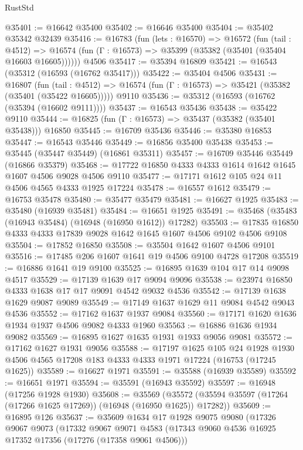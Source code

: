 \begin{lexlean}{RustStd}
\begin{coremodule}
@35401 := @16642 @35400
@35402 := @16646 @35400
@35404 := @35402 @35342 @32439
@35416 := @16783
    (fun (lets : @16570) =>
    @16572
      (fun (tail : @4512) =>
      @16574 (fun (Γ : @16573) => @35399 (@35382 (@35401 (@35404 @16603 @16605))))))
    @4506
@35417 := @35394 @16809
@35421 := @16543 (@35312 (@16593 (@16762 @35417)))
@35422 := @35404 @4506
@35431 := @16807
    (fun (tail : @4512) => @16574 (fun (Γ : @16573) => @35421 (@35382 (@35401 (@35422 @16605)))))
    @9110
@35436 := @35312 (@16593 (@16762 (@35394 (@16602 @9111))))
@35437 := @16543 @35436
@35438 := @35422 @9110
@35444 := @16825 (fun (Γ : @16573) => @35437 (@35382 (@35401 @35438))) @16850
@35445 := @16709 @35436
@35446 := @35380 @16853
@35447 := @16543 @35446
@35449 := @16856 @35400 @35438
@35453 := @35445 (@35447 @35449) (@16861 @35311)
@35457 := @16709 @35446 @35449 (@16866 @35379)
@35468 := @17722 @16850 @4333 @4333 @1614 @1642 @1645 @1607 @4506 @9028 @4506 @9110
@35477 := @17171 @1612 @105 @24 @11 @4506 @4565 @4333 @1925 @17224
@35478 := @16557 @1612
@35479 := @16753 @35478
@35480 := @35477 @35479
@35481 := @16627 @1925
@35483 := @35480 (@16939 @35481)
@35484 := @16651 @1925
@35491 := @35468 (@35483 (@16943 @35484) (@16948 (@16950 @1612)) @17282)
@35503 := @17835 @16850 @4333 @4333 @17839 @9028 @1642 @1645 @1607 @4506 @9102 @4506 @9108
@35504 := @17852 @16850
@35508 := @35504 @1642 @1607 @4506 @9101
@35516 := @17485 @206 @1607 @1641 @19 @4506 @9100 @4728 @17208
@35519 := @16886 @1641 @19 @9100
@35525 := @16895 @1639 @104 @17 @14 @9098 @4517
@35529 := @17139 @1639 @17 @9094 @9096
@35538 := @23974 @16850 @4333 @1638 @17 @17 @9091 @4542 @9032 @4536
@35542 := @17139 @1638 @1629 @9087 @9089
@35549 := @17149 @1637 @1629 @11 @9084 @4542 @9043 @4536
@35552 := @17162 @1637 @1937 @9084
@35560 := @17171 @1620 @1636 @1934 @1937 @4506 @9082 @4333 @1960
@35563 := @16886 @1636 @1934 @9082
@35569 := @16895 @1627 @1635 @1931 @1933 @9056 @9081
@35572 := @17162 @1627 @1931 @9056
@35588 := @17197
    @1625
    @105
    @24
    @1928
    @1930
    @4506
    @4565
    @17208
    @183
    @4333
    @4333
    @1971
    @17224
    (@16753 (@17245 @1625))
@35589 := @16627 @1971
@35591 := @35588 (@16939 @35589)
@35592 := @16651 @1971
@35594 := @35591 (@16943 @35592)
@35597 := @16948 (@17256 @1928 @1930)
@35608 := @35569
    (@35572 (@35594 @35597 (@17264 (@17266 @1625 @17269)) (@16948 (@16950 @1625)) @17282))
@35609 := @16895 @126
@35637 := @35609
    @1634
    @17
    @1928
    @9075
    @9080
    (@17326
      @9067
      @9073
      (@17332
        @9067
        @9071
        @4583
        (@17343 @9060 @4536 @16925 @17352 @17356 (@17276 (@17358 @9061 @4506)))

\end{coremodule}
\end{lexlean}
